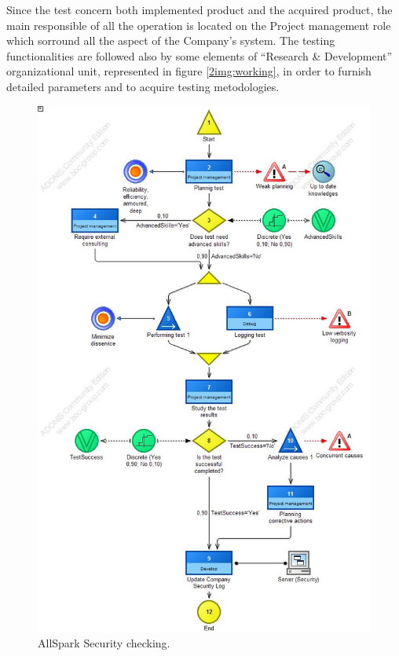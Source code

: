 Since the test concern both implemented product and the acquired product, the main responsible of all the operation is located on the Project management role which sorround all the aspect of the Company's system. The testing functionalities are followed also by some elements of ``Research \& Development'' organizational unit, represented in figure \ref{2img:working}, in order to furnish detailed parameters and to acquire testing metodologies.

\begin{figure}[ht!]
\begin{centering}
\includegraphics[scale=0.50]{assign2/adonis/imgs/security.jpg}
\caption{AllSpark Security checking.}
\label{2img:security}
\end{centering}
\end{figure}


